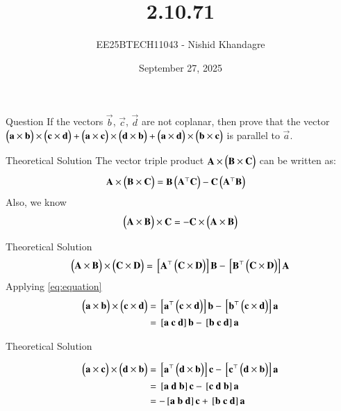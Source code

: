 \documentclass{beamer}
\title
{2.10.71}
\date{September 27, 2025}
\author
{EE25BTECH11043 - Nishid Khandagre}
\begin{document}
\frame{\titlepage}

\begin{frame}{Question}
If the vectors $\vec{b}$, $\vec{c}$, $\vec{d}$ are not coplanar, then prove that the vector
$\begin{pmatrix}\mathbf{a} \times\mathbf{b}\end{pmatrix} \times\begin{pmatrix}\mathbf{c} \times\mathbf{d}\end{pmatrix} + \begin{pmatrix}\mathbf{a} \times\mathbf{c}\end{pmatrix} \times\begin{pmatrix}\mathbf{d} \times\mathbf{b}\end{pmatrix} + \begin{pmatrix}\mathbf{a} \times\mathbf{d}\end{pmatrix} \times\begin{pmatrix}\mathbf{b} \times\mathbf{c}\end{pmatrix}$
is parallel to $\vec{a}$.
\end{frame}

\begin{frame}{Theoretical Solution}
The vector triple product $\mathbf{A} \times \begin{pmatrix}\mathbf{B} \times \mathbf{C}\end{pmatrix}$ can be written as:
\begin{align}
\mathbf{A} \times \begin{pmatrix}\mathbf{B} \times \mathbf{C}\end{pmatrix} &= \mathbf{B}\begin{pmatrix}\mathbf{A}^\top \mathbf{C}\end{pmatrix} - \mathbf{C}\begin{pmatrix}\mathbf{A}^\top \mathbf{B}\end{pmatrix}
\end{align}
Also, we know
\begin{align}
\begin{pmatrix}\mathbf{A} \times \mathbf{B}\end{pmatrix} \times \mathbf{C} = - \mathbf{C} \times \begin{pmatrix}\mathbf{A} \times \mathbf{B}\end{pmatrix}
\end{align}
\end{frame}

\begin{frame}{Theoretical Solution}
\begin{align}
\begin{pmatrix}\mathbf{A} \times \mathbf{B}\end{pmatrix} \times \begin{pmatrix}\mathbf{C} \times \mathbf{D}\end{pmatrix} = {}\left[\mathbf{A}^\top \begin{pmatrix}\mathbf{C} \times \mathbf{D}\end{pmatrix}\right] \mathbf{B} - {}\left[\mathbf{B}^\top \begin{pmatrix}\mathbf{C} \times \mathbf{D}\end{pmatrix}\right] \mathbf{A}
\label{eq:equation}
\end{align}
Applying \eqref{eq:equation}
\begin{align}
\myvec{\vec{a} \times\vec{b}}\times \myvec{\vec{c} \times\vec{d}}&= \sbrak{\vec{a}^\top \myvec{\vec{c} \times \vec{d}}} \vec{b} - \sbrak{\vec{b}^\top \myvec{\vec{c} \times \vec{d}}} \vec{a}\\
&=\sbrak{\vec{a} \ \vec{c} \ \vec{d}}\vec{b} - \sbrak{\vec{b} \ \vec{c} \ \vec{d}}\vec{a}
\end{align}
\end{frame}

\begin{frame}{Theoretical Solution}

\begin{align}
\myvec{\vec{a} \times\vec{c}} \times\myvec{\vec{d} \times\vec{b}}&=
\sbrak{\vec{a}^\top \myvec{\vec{d} \times \vec{b}}} \vec{c} - \sbrak{\vec{c}^\top \myvec{\vec{d} \times \vec{b}}} \vec{a}\\
&= \sbrak{\vec{a} \ \vec{d} \ \vec{b}}\vec{c} - \sbrak{\vec{c} \ \vec{d} \ \vec{b}}\vec{a} \\
&= -\sbrak{\vec{a} \ \vec{b} \ \vec{d}}\vec{c} + \sbrak{\vec{b} \ \vec{c} \ \vec{d}}\vec{a}
\end{align}
\end{frame}
\end{document}
